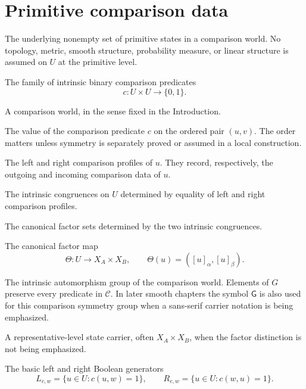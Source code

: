 \section*{Primitive comparison data}
\begin{description}[leftmargin=3.6cm,style=nextline]
\item[\(U\)]
The underlying nonempty set of primitive states in a comparison world.
No topology, metric, smooth structure, probability measure, or linear
structure is assumed on \(U\) at the primitive level.
\item[\(\mathcal C\)]
The family of intrinsic binary comparison predicates
\[
        c:U\times U\to\{0,1\}.
\]
\item[\((U,\mathcal C)\)]
A comparison world, in the sense fixed in the Introduction.
\item[\(c(u,v)\)]
The value of the comparison predicate \(c\) on the ordered pair
\((u,v)\).  The order matters unless symmetry is separately proved or
assumed in a local construction.
\item[\(\mathsf L(u)\), \(\mathsf R(u)\)]
The left and right comparison profiles of \(u\).  They record,
respectively, the outgoing and incoming comparison data of \(u\).
\item[\(\alpha,\beta\)]
The intrinsic congruences on \(U\) determined by equality of left and
right comparison profiles.
\item[\(X_A=U/\alpha\), \(X_B=U/\beta\)]
The canonical factor sets determined by the two intrinsic congruences.
\item[\(\Theta\)]
The canonical factor map
\[
        \Theta:U\to X_A\times X_B,
        \qquad
        \Theta(u)=([u]_\alpha,[u]_\beta).
\]
\item[\(G=\Aut(U,\mathcal C)\)]
The intrinsic automorphism group of the comparison world.  Elements of
\(G\) preserve every predicate in \(\mathcal C\).  In later smooth
chapters the symbol \(\mathsf G\) is also used for this comparison
symmetry group when a sans-serif carrier notation is being emphasized.
\item[\(X\)]
A representative-level state carrier, often \(X_A\times X_B\), when the
factor distinction is not being emphasized.
\item[\(L_{c,w}\), \(R_{c,w}\)]
The basic left and right Boolean generators
\[
        L_{c,w}=\{u\in U:c(u,w)=1\},
        \qquad
        R_{c,w}=\{u\in U:c(w,u)=1\}.
\]
\end{description}


